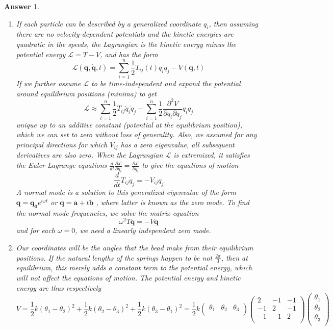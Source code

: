 \documentclass[a4paper]{article}
\newtheorem{ans}{Answer}[section]
\theoremstyle{new}
\begin{document}
\begin{ans}\leavevmode
\begin{enumerate}[label=(\alph*)]
\item If each particle can be described by a generalized coordinate $q_i$, then assuming there are no velocity-dependent potentials and the kinetic energies are quadratic in the speeds, the Lagrangian is the kinetic energy minus the potential energy $\mathcal{L}=T-V$, and has the form
$$\mathcal{L}(\mathbf{q},\mathbf{\dot{q}},t)=\sum_{i=1}^n\frac{1}{2}T_{ij}(t)\dot{q}_i\dot{q}_j-V(\mathbf{q},t)$$
If we further assume $\mathcal{L}$ to be time-independent and expand the potential around equilibrium positions (minima) to get
$$\mathcal{L}\approx\sum_{i=1}^n\frac{1}{2}T_{ij}\dot{q}_i\dot{q}_j-\sum_{i=1}^n\frac{1}{2}\frac{\partial^2V}{\partial q_i\partial q_j}q_iq_j$$
unique up to an additive constant (potential at the equilibrium position), which we can set to zero without loss of generality. Also, we assumed for any principal directions for which $V_{ij}$ has a zero eigenvalue, all subsequent derivatives are also zero. When the Lagrangian $\mathcal{L}$ is extremized, it satisfies the Euler-Lagrange equations $\frac{d}{dt}\frac{\partial\mathcal{L}}{\partial\dot{q}_i}=\frac{\partial\mathcal{L}}{\partial q_i}$ to give the equations of motion
$$\frac{d}{dt}T_{ij}\dot{q}_j=-V_{ij}q_j$$
A normal mode is a solution to this generalized eigenvalue of the form $\mathbf{q}=\mathbf{q_0}e^{i\omega t}$ or $\mathbf{q}=\mathbf{a}+t\mathbf{b}$
, where latter is known as the zero mode. To find the normal mode frequencies, we solve the matrix equation
$$\omega^2T\mathbf{q}=-V\mathbf{q}$$
and for each $\omega=0$, we need a linearly independent zero mode.
\item Our coordinates will be the angles that the bead make from their equilibrium positions. If the natural lengths of the springs happen to be not $\frac{2\pi}{3}$, then at equilibrium, this merely adds a constant term to the potential energy, which will not affect the equations of motion. The potential energy and kinetic energy are thus respectively
$$V=\frac{1}{2}k(\theta_1-\theta_2)^2+\frac{1}{2}k(\theta_2-\theta_3)^2+\frac{1}{2}k(\theta_3-\theta_1)^2=\frac{1}{2}k\begin{pmatrix}\theta_1&\theta_2&\theta_3\\\end{pmatrix}\begin{pmatrix}2&-1&-1\\-1&2&-1\\-1&-1&2\\\end{pmatrix}\begin{pmatrix}\theta_1\\\theta_2\\\theta_3\\\end{pmatrix}$$

\end{enumerate}
\end{ans}
\end{document}
